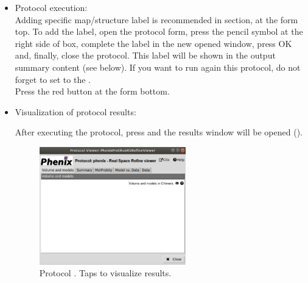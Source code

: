\begin{itemize}
 \item Protocol execution:\\
 Adding specific map/structure label is recommended in  section, at the form top. To add the label, open the protocol form, press the pencil symbol at the right side of  box, complete the label in the new opened window, press OK and, finally, close the protocol. This label will be shown in the output summary content (see below). If you want to run again this protocol, do not forget to set to  the .\\
  Press the  red button at the form bottom.
  
 \item Visualization of protocol results:
 
 After executing the protocol, press  and the results window will be opened (). 
  
    \begin{figure}[H]
     \centering 
     \captionsetup{width=.7\linewidth} 
     \includegraphics[width=0.60\textwidth]{Images_appendix/Fig149.pdf}
     \caption{Protocol . Taps to visualize  results.}
     \label{fig:app_protocol_real_space_refine_2}
    \end{figure}
    

\end{itemize}
